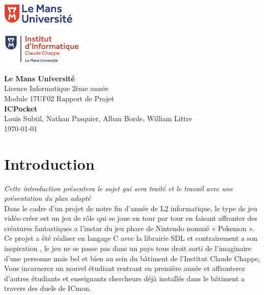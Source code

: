 \documentclass[12pt,a4paper, twoside]{article}
\begin{document}
\begin{titlepage}
    \begin{minipage}[t]{0.48\textwidth}
        \includegraphics[height=1.01cm]{logolemansU.png}
    \end{minipage}
    \hfill
    \begin{minipage}[t]{0.25\textwidth}
        \includegraphics[height=1.6cm]{logo_IC2.png}
    \end{minipage}
    
    \vspace{2cm}
    \begin{center}
        \Large\textbf{Le Mans Université}\\
        \vspace{0.5cm}
        Licence Informatique 2ème année\\
        Module 17UF02 Rapport de Projet\\
        \vspace{0.5cm}
        \Large\textbf{ICPocket}\\
        \vspace{1cm}
        {\large Louis Subtil, Nathan Pasquier, Alban Borde, William Littre}\\
        \vspace{0.5cm}
        {\normalsize \today} 
    \end{center}
\end{titlepage}

\newpage
\tableofcontents
\newpage
{}
\section{Introduction}

\emph{Cette introduction présentera le sujet qui sera traité et le travail avec une présentation du plan adopté}\\
Dans le cadre d'un projet de notre fin d'année de L2 informatique, le type de jeu vidéo créer est un jeu de rôle qui se joue en tour par tour en faisant affronter des créatures fantastiques a l’instar du jeu phare de Nintendo nommé « Pokemon ».\\
Ce projet a été réaliser en langage C avec la librairie SDL et contrairement a son inspiration , le jeu ne se passe pas dans un pays tous droit sorti de l’imaginaire d’une personne mais bel et bien au sein du bâtiment de l’Institut Claude Chappe, Vous incarnerez un nouvel étudiant rentrant en première année et affronterez d'autres étudiants et enseignants chercheurs déjà installés dans le bâtiment a travers des duels de ICmon.\\ 
\end{document}
